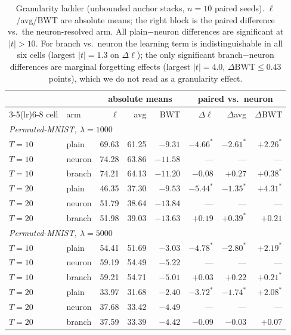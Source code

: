 \documentclass[review,12pt,number]{elsarticle}
\begin{document}
\begin{table}[t]
\centering\footnotesize\setlength{\tabcolsep}{4.5pt}
\caption{Granularity ladder (unbounded anchor stacks, $n{=}10$ paired
seeds). $\ell$/avg/BWT are absolute means; the right block is the paired
difference vs.\ the neuron-resolved arm. All plain$-$neuron differences are
significant at $|t|>10$. For branch vs.\ neuron the learning term is
indistinguishable in all six cells (largest $|t| = 1.3$ on $\Delta\ell$);
the only significant branch$-$neuron differences are marginal forgetting
effects (largest $|t| = 4.0$, $\Delta\mathrm{BWT} \le 0.43$ points), which
we do not read as a granularity effect.}
\label{tab:gran}
\begin{tabular}{llrrrr rr}
\toprule
 & & \multicolumn{3}{c}{absolute means} & \multicolumn{3}{c}{paired vs.\ neuron} \\
\cmidrule(lr){3-5}\cmidrule(lr){6-8}
cell & arm & $\ell$ & avg & BWT & $\Delta\ell$ & $\Delta$avg & $\Delta$BWT \\
\midrule
\multicolumn{8}{l}{\emph{Permuted-MNIST, $\lambda{=}1000$}}\\
$T{=}10$ & plain  & 69.63 & 61.25 & $-9.31$ & $-4.66^{*}$ & $-2.61^{*}$ & $+2.26^{*}$ \\
$T{=}10$ & neuron & 74.28 & 63.86 & $-11.58$ & --- & --- & --- \\
$T{=}10$ & branch & 74.21 & 64.13 & $-11.20$ & $-0.08$ & $+0.27$ & $+0.38^{*}$ \\
$T{=}20$ & plain  & 46.35 & 37.30 & $-9.53$ & $-5.44^{*}$ & $-1.35^{*}$ & $+4.31^{*}$ \\
$T{=}20$ & neuron & 51.79 & 38.64 & $-13.84$ & --- & --- & --- \\
$T{=}20$ & branch & 51.98 & 39.03 & $-13.63$ & $+0.19$ & $+0.39^{*}$ & $+0.21$ \\
\midrule
\multicolumn{8}{l}{\emph{Permuted-MNIST, $\lambda{=}5000$}}\\
$T{=}10$ & plain  & 54.41 & 51.69 & $-3.03$ & $-4.78^{*}$ & $-2.80^{*}$ & $+2.19^{*}$ \\
$T{=}10$ & neuron & 59.19 & 54.49 & $-5.22$ & --- & --- & --- \\
$T{=}10$ & branch & 59.21 & 54.71 & $-5.01$ & $+0.03$ & $+0.22$ & $+0.21^{*}$ \\
$T{=}20$ & plain  & 33.97 & 31.68 & $-2.40$ & $-3.72^{*}$ & $-1.74^{*}$ & $+2.08^{*}$ \\
$T{=}20$ & neuron & 37.68 & 33.42 & $-4.49$ & --- & --- & --- \\
$T{=}20$ & branch & 37.59 & 33.39 & $-4.42$ & $-0.09$ & $-0.03$ & $+0.07$ \\

\end{tabular}
\end{table}
\end{document}
